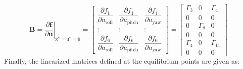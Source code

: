 \documentclass[3p]{elsarticle}
\begin{document}
\begin{equation}
    \mathbf{B} = \left.\dfrac{\partial \mathbf{f}}{\partial \mathbf{u}}\right|_{\boldsymbol{{\mathrm{x}}}^*= \boldsymbol{{\mathrm{u}}}^*=\boldsymbol{0}} = \begin{bmatrix}
        \dfrac{\partial f_1}{\partial u_\text{roll}} & \dfrac{\partial f_1}{\partial u_\text{pitch}} & \dfrac{\partial f_1}{\partial u_\text{yaw}}\\
        \vdots & \vdots & \vdots \\
        \dfrac{\partial f_6}{\partial u_\text{roll}} & \dfrac{\partial f_6}{\partial u_\text{pitch}} & \dfrac{\partial f_6}{\partial u_\text{yaw}}
    \end{bmatrix} =     \begin{bmatrix}
        \Gamma_3 & 0 & \Gamma_4\\
        0 & 0 & 0 \\
        0 & \Gamma_8 & 0 \\
        0 & 0 & 0 \\
        \Gamma_4 & 0 & \Gamma_{11} \\
        0 & 0 & 0
    \end{bmatrix}
\end{equation}
Finally, the linearized matrices defined at the equilibrium points are given as:
\end{document}
